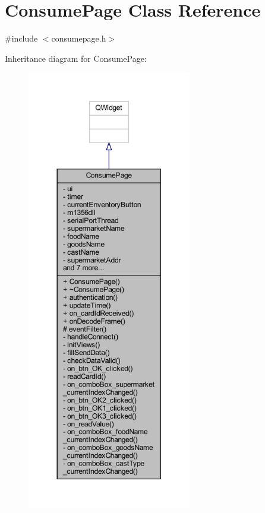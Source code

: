 \hypertarget{class_consume_page}{}\section{Consume\+Page Class Reference}
\label{class_consume_page}


{\ttfamily \#include $<$consumepage.\+h$>$}



Inheritance diagram for Consume\+Page\+:
\nopagebreak
\begin{figure}[H]
\begin{center}
\leavevmode
\includegraphics[height=550pt]{class_consume_page__inherit__graph}
\end{center}
\end{figure}


